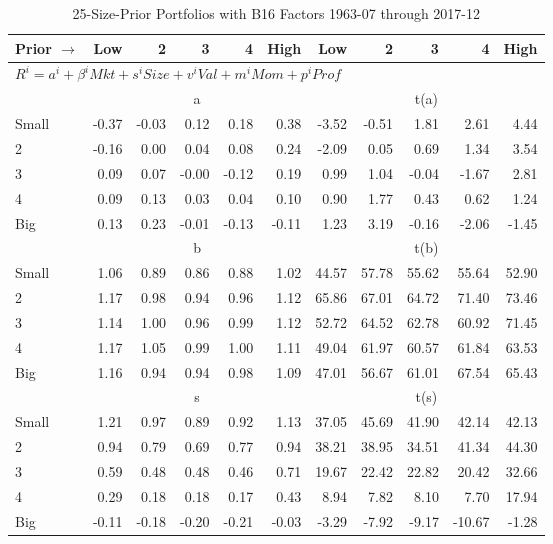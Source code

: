
\begin{table}[H]
\footnotesize
\centering
\caption{25-Size-Prior Portfolios with B16 Factors 1963-07 through 2017-12}
\begin{tabular}{lrrrrrrrrrr}
  \toprule
    
    Prior $\rightarrow$ & Low & 2 & 3 & 4 & High & Low & 2 & 3 & 4 & High  \\ 
  \midrule
  \multicolumn{11}{l}{$R^i=a^i+\beta^iMkt+s^iSize+v^iVal+m^iMom+p^iProf$}  \\
  
     & \multicolumn{5}{c}{a} & \multicolumn{5}{c}{t(a)}   \\
     \cmidrule(r){2-6} \cmidrule(r){7-11} 
    Small  & -0.37  & -0.03  & 0.12  & 0.18  & 0.38  & -3.52  & -0.51  & 1.81  & 2.61  & 4.44   \\
    2  & -0.16  & 0.00  & 0.04  & 0.08  & 0.24  & -2.09  & 0.05  & 0.69  & 1.34  & 3.54   \\
    3  & 0.09  & 0.07  & -0.00  & -0.12  & 0.19  & 0.99  & 1.04  & -0.04  & -1.67  & 2.81   \\
    4  & 0.09  & 0.13  & 0.03  & 0.04  & 0.10  & 0.90  & 1.77  & 0.43  & 0.62  & 1.24   \\
    Big  & 0.13  & 0.23  & -0.01  & -0.13  & -0.11  & 1.23  & 3.19  & -0.16  & -2.06  & -1.45   \\
    
  
     & \multicolumn{5}{c}{b} & \multicolumn{5}{c}{t(b)}   \\
     \cmidrule(r){2-6} \cmidrule(r){7-11} 
    Small  & 1.06  & 0.89  & 0.86  & 0.88  & 1.02  & 44.57  & 57.78  & 55.62  & 55.64  & 52.90   \\
    2  & 1.17  & 0.98  & 0.94  & 0.96  & 1.12  & 65.86  & 67.01  & 64.72  & 71.40  & 73.46   \\
    3  & 1.14  & 1.00  & 0.96  & 0.99  & 1.12  & 52.72  & 64.52  & 62.78  & 60.92  & 71.45   \\
    4  & 1.17  & 1.05  & 0.99  & 1.00  & 1.11  & 49.04  & 61.97  & 60.57  & 61.84  & 63.53   \\
    Big  & 1.16  & 0.94  & 0.94  & 0.98  & 1.09  & 47.01  & 56.67  & 61.01  & 67.54  & 65.43   \\
    
  
     & \multicolumn{5}{c}{s} & \multicolumn{5}{c}{t(s)}   \\
     \cmidrule(r){2-6} \cmidrule(r){7-11} 
    Small  & 1.21  & 0.97  & 0.89  & 0.92  & 1.13  & 37.05  & 45.69  & 41.90  & 42.14  & 42.13   \\
    2  & 0.94  & 0.79  & 0.69  & 0.77  & 0.94  & 38.21  & 38.95  & 34.51  & 41.34  & 44.30   \\
    3  & 0.59  & 0.48  & 0.48  & 0.46  & 0.71  & 19.67  & 22.42  & 22.82  & 20.42  & 32.66   \\
    4  & 0.29  & 0.18  & 0.18  & 0.17  & 0.43  & 8.94  & 7.82  & 8.10  & 7.70  & 17.94   \\
    Big  & -0.11  & -0.18  & -0.20  & -0.21  & -0.03  & -3.29  & -7.92  & -9.17  & -10.67  & -1.28   \\
    

\end{tabular}
\end{table}
